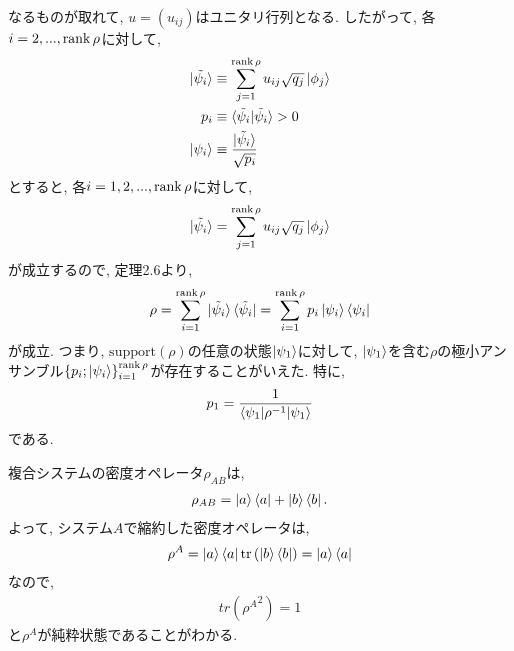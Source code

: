 \begin{ex}
\begin{align*}
    \end{align*}
    なるものが取れて, $u = (u_{ij})$はユニタリ行列となる. 
    したがって, 各$i = 2, ..., \operatorname{rank} \rho$に対して, 
    \begin{align*}
        \ket{\tilde{\psi_i}} &\equiv \sum_{j=1}^{\operatorname{rank} \rho} u_{ij} \sqrt{q_j} \ket{\phi_j} \\
        p_i &\equiv \braket{\tilde{\psi_i}|\tilde{\psi_i}} > 0 \\
        \ket{\psi_i} &\equiv \frac{\ket{\tilde{\psi_i}}}{\sqrt{p_i}}
    \end{align*}
    とすると, 
    各$i = 1, 2, ..., \operatorname{rank} \rho$に対して, 
    \begin{align*}
        \ket{\tilde{\psi_i}} = \sum_{j=1}^{\operatorname{rank} \rho} u_{ij} \sqrt{q_j} \ket{\phi_j}
    \end{align*}
    が成立するので, 定理2.6より,
    \begin{align*}
        \rho 
        = 
        \sum_{i=1}^{\operatorname{rank} \rho} \ket{\tilde{\psi_i}}\bra{\tilde{\psi_i}}
        =
        \sum_{i=1}^{\operatorname{rank} \rho} p_i \ket{\psi_i}\bra{\psi_i}
    \end{align*}
    が成立. 
    つまり, 
    $\mathrm{support}\left( \rho \right)$の任意の状態$\ket{\psi_1}$に対して,
    $\ket{\psi_1}$を含む$\rho$の極小アンサンブル$\left\{ p_i ; \ket{\psi_i}\right\}_{i=1}^{\operatorname{rank} \rho}$が存在することがいえた. 特に, 
    \begin{align*}
        p_1 = \frac{1}{\braket{\psi_1 | \rho^{-1} | \psi_1}}
    \end{align*}
    である.
\end{ex}

\begin{ex}
    \label{ex2.74}
    複合システムの密度オペレータ$\rho_{AB}$は,
    \begin{align*}
        \rho_{AB} = \ket{a} \bra{a} + \ket{b} \bra{b}.
    \end{align*}
    よって, システム$A$で縮約した密度オペレータは,
    \begin{align*}
        \rho^A = \ket{a} \bra{a} \mathrm{tr}\left(\ket{b} \bra{b}\right) = \ket{a} \bra{a}
    \end{align*}
    なので,
    \begin{align*}
        tr\left({\rho^{A}}^2\right) = 1
    \end{align*}
    と$\rho^A$が純粋状態であることがわかる.
\end{ex}


